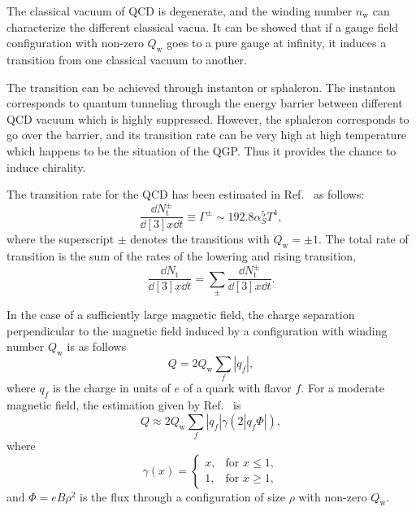\documentclass[preprint]{elsarticle}
\begin{document}
The classical vacuum of QCD is degenerate, and the winding number $n_\text{w}$ can characterize the different classical vacua. It can be showed that if a gauge field configuration with non-zero $Q_\text{w}$ goes to a pure gauge at infinity, it induces a transition from one classical vacuum to another.

The transition can be achieved through instanton\cite{Diakonov:2002fq,Schafer:1995pz} or sphaleron\cite{Arnold:1987zg,Fukugita:1990gb}. The instanton corresponds to quantum tunneling through the energy barrier between different QCD vacuum which is highly suppressed. However, the sphaleron corresponds to go over the barrier, and its transition rate can be very high at high temperature which happens to be the situation of the QGP. Thus it provides the chance to induce chirality.

The transition rate for the QCD has been estimated in Ref.~\cite{Kharzeev:2007jp} as follows:
\begin{equation} \label{tranRate}
\frac{\dd{N^\pm_\text{t}}}{\dd[3]{x}\dd{t}} \equiv \Gamma^\pm \sim 192.8 \alpha^5_S T^4,
\end{equation}
where the superscript $\pm$ denotes the transitions with $Q_\text{w} = \pm 1$. The total rate of transition is the sum of the rates of the lowering and rising transition,
\begin{equation}
\frac{\dd{N_\text{t}}}{\dd[3]{x}\dd{t}} = \sum_\pm \frac{\dd{N_\text{t}^\pm}}{\dd[3]{x}\dd{t}}.
\end{equation}

In the case of a sufficiently large magnetic field, the charge separation perpendicular to the magnetic field induced by a configuration with winding number $Q_\text{w}$ is as follows
\begin{equation}
Q = 2 Q_\text{w} \sum_f |q_f|,
\end{equation}
where $q_f$ is the charge in units of $e$ of a quark with flavor $f$. For a moderate magnetic field, the estimation given by Ref.~\cite{Kharzeev:2007jp} is
\begin{equation}
Q \approx 2 Q_\text{w} \sum_f |q_f| \gamma(2|q_f \Phi|),
\end{equation}
where
\begin{equation}
\gamma(x) = \begin{cases}
x, & \text{for } x \leq 1, \\
1, & \text{for } x \geq 1,
\end{cases}
\end{equation}
and $\Phi = eB\rho^2$ is the flux through a configuration of size $\rho$ with non-zero $Q_\text{w}$.
\end{document}
